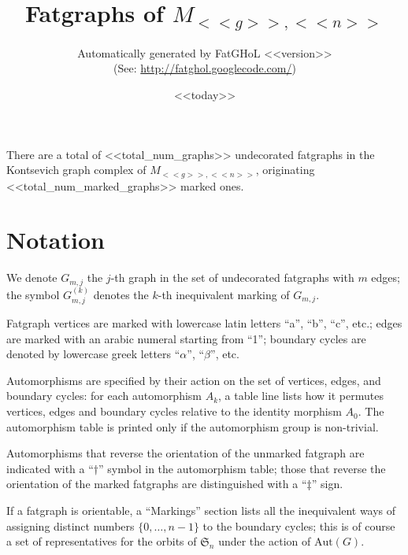\documentclass[a4paper]{article}
\begin{document}
\title{Fatgraphs of $M_{<<g>>,<<n>>}$}
\author{%
  Automatically generated by FatGHoL <<version>>
  \\
  (See: \url{http://fatghol.googlecode.com/})
  }
\date{ <<today>> }
\maketitle


\noindent{}
There are a total of <<total_num_graphs>> undecorated fatgraphs in the
Kontsevich graph complex of $M_{<<g>>,<<n>>}$, originating
<<total_num_marked_graphs>> marked ones.


\setcounter{tocdepth}{1}
\tableofcontents

\clearpage


\section{Notation}

We denote $G_{m,j}$ the $j$-th graph in the set of undecorated
fatgraphs with $m$ edges; the symbol $G_{m,j}^{(k)}$ denotes the
$k$-th inequivalent marking of $G_{m,j}$.

Fatgraph vertices are marked with lowercase latin letters
``a'', ``b'', ``c'', etc.; edges are marked with an arabic
numeral starting from ``1''; boundary cycles are denoted
by lowercase greek letters ``$\alpha$'', ``$\beta$'', etc.

Automorphisms are specified by their action on the set of vertices,
edges, and boundary cycles: for each automorphism $A_k$, a table line
lists how it permutes vertices, edges and boundary cycles relative to
the identity morphism $A_0$.  The automorphism table is printed only
if the automorphism group is non-trivial.

Automorphisms that reverse the orientation of the unmarked fatgraph
are indicated with a ``$\dag$'' symbol in the automorphism table;
those that reverse the orientation of the marked fatgraphs are
distinguished with a ``$\ddag$'' sign.

If a fatgraph is orientable, a ``Markings'' section lists all the
inequivalent ways of assigning distinct numbers $\{0, \ldots, n-1\}$
to the boundary cycles; this is of course a set of representatives for
the orbits of $\mathfrak{S}_n$ under the action of $\mathrm{Aut}(G)$.
\end{document}
